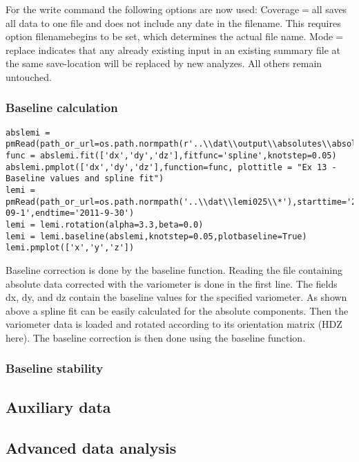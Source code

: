 For the write command the following options are now used: Coverage$=$all saves all data to one file and does not include any date in the filename. This requires option filenamebegins to be set, which determines the actual file name. Mode$=$replace indicates that any already existing input in an existing summary file at the same save-location will be replaced by new analyzes. All others remain untouched.


\subsubsection{Baseline calculation}
\begin{verbatim}
abslemi = pmRead(path_or_url=os.path.normpath(r'..\\dat\\output\\absolutes\\absolutes_lemi.txt'))
func = abslemi.fit(['dx','dy','dz'],fitfunc='spline',knotstep=0.05)
abslemi.pmplot(['dx','dy','dz'],function=func, plottitle = "Ex 13 - Baseline values and spline fit")
lemi = pmRead(path_or_url=os.path.normpath('..\\dat\\lemi025\\*'),starttime='2011-09-1',endtime='2011-9-30')
lemi = lemi.rotation(alpha=3.3,beta=0.0)
lemi = lemi.baseline(abslemi,knotstep=0.05,plotbaseline=True)
lemi.pmplot(['x','y','z'])
\end{verbatim}

Baseline correction is done by the baseline function. Reading the file containing absolute data corrected with the variometer is done in the first line. The fields dx, dy, and dz contain the baseline values for the specified variometer. As shown above a spline fit can be easily calculated for the absolute components. Then the variometer data is loaded and rotated according to its orientation matrix (HDZ here). The baseline correction is then done using the baseline function.


\subsubsection{Baseline stability}

\subsection{Auxiliary data}


\subsection{Advanced data analysis}

